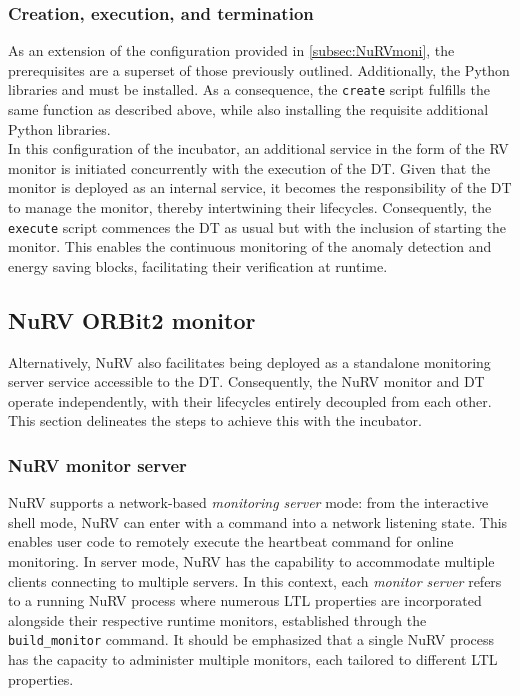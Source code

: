 \subsubsection{Creation, execution, and termination}
As an extension of the configuration provided in \cref{subsec:NuRVmoni}, the prerequisites are a superset of those previously outlined.
Additionally, the Python libraries  and  must be installed.
As a consequence, the \texttt{create} script fulfills the same function as described above, while also installing the requisite additional Python libraries.\\
In this configuration of the incubator, an additional service in the form of the RV monitor is initiated concurrently with the execution of the DT.
Given that the monitor is deployed as an internal service, it becomes the responsibility of the DT to manage the monitor, thereby intertwining their lifecycles.
Consequently, the \texttt{execute} script commences the DT as usual but with the inclusion of starting the monitor.
This enables the continuous monitoring of the anomaly detection and energy saving blocks, facilitating their verification at runtime.

\subsection{NuRV ORBit2 monitor}\label{subsec:NuRVORBIT}
Alternatively, NuRV also facilitates being deployed as a standalone monitoring server service accessible to the DT.
Consequently, the NuRV monitor and DT operate independently, with their lifecycles entirely decoupled from each other.
This section delineates the steps to achieve this with the incubator.

\subsubsection{NuRV monitor server}
NuRV supports a network-based \textit{monitoring server} mode: from the interactive shell mode, NuRV can enter with a command into a network listening state. This enables user code to remotely execute the heartbeat command for online monitoring.
In server mode, NuRV has the capability to accommodate multiple clients connecting to multiple servers. In this context, each \textit{monitor server} refers to a running NuRV process where numerous LTL properties are incorporated alongside their respective runtime monitors, established through the \texttt{build\_monitor} command. It should be emphasized that a single NuRV process has the capacity to administer multiple monitors, each tailored to different LTL properties.


